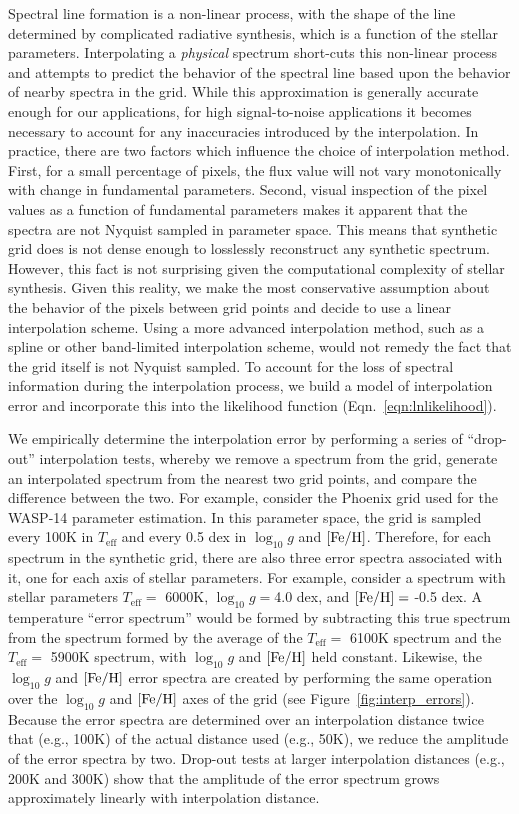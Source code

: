 \documentclass[iop,floatfix]{emulateapj}
\newcommand{\Z}{[{\rm Fe}/{\rm H}]}
\begin{document}
Spectral line formation is a non-linear process, with the shape of the line determined by complicated radiative synthesis, which is a function of the stellar parameters. Interpolating a \emph{physical} spectrum short-cuts this non-linear process and attempts to predict the behavior of the spectral line based upon the behavior of nearby spectra in the grid. While this approximation is generally accurate enough for our applications, for high signal-to-noise applications it becomes necessary to account for any inaccuracies introduced by the interpolation. In practice, there are two factors which influence the choice of interpolation method. First, for a small percentage of pixels, the flux value will not vary monotonically with change in fundamental parameters. Second, visual inspection of the pixel values as a function of fundamental parameters makes it apparent that the spectra are not Nyquist sampled in parameter space. This means that synthetic grid does is not dense enough to losslessly reconstruct any synthetic spectrum. However, this fact is not surprising given the computational complexity of stellar synthesis. Given this reality, we make the most conservative assumption about the behavior of the pixels between grid points and decide to use a linear interpolation scheme. Using a more advanced interpolation method, such as a spline or other band-limited interpolation scheme, would not remedy the fact that the grid itself is not Nyquist sampled. To account for the loss of spectral information during the interpolation process, we build a model of interpolation error and incorporate this into the likelihood function (Eqn.~\ref{eqn:lnlikelihood}).

We empirically determine the interpolation error by performing a series of ``drop-out'' interpolation tests, whereby we remove a spectrum from the grid, generate an interpolated spectrum from the nearest two grid points, and compare the difference between the two. For example, consider the {\sc Phoenix} grid used for the WASP-14 parameter estimation. In this parameter space, the grid is sampled every 100K in $T_\textrm{eff}$ and every 0.5 dex in $\log_{10} g$ and $\Z$. Therefore, for each spectrum in the synthetic grid, there are also three error spectra associated with it, one for each axis of stellar parameters. For example, consider a spectrum with stellar parameters $T_\textrm{eff} = $ 6000K, $\log_{10} g=$4.0 dex, and $\Z = $ -0.5 dex. A temperature ``error spectrum'' would be formed by subtracting this true spectrum from the spectrum formed by the average of the $T_\textrm{eff} = $ 6100K spectrum and the $T_\textrm{eff} = $ 5900K spectrum, with $\log_{10} g$ and $\Z$ held constant. Likewise, the $\log_{10} g$ and $\Z$ error spectra are created by performing the same operation over the $\log_{10} g$ and $\Z$ axes of the grid (see Figure~\ref{fig:interp_errors}). Because the error spectra are determined over an interpolation distance twice that (e.g., 100K) of the actual distance used (e.g., 50K), we reduce the amplitude of the error spectra by two. Drop-out tests at larger interpolation distances (e.g., 200K and 300K) show that the amplitude of the error spectrum grows approximately linearly with interpolation distance. 
\end{document}
